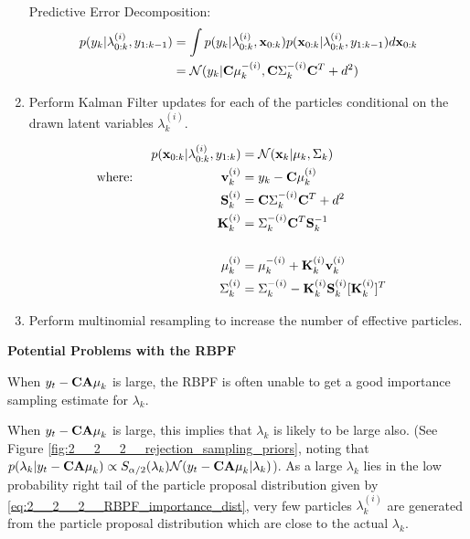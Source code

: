 \documentclass[../main.tex]{subfiles}
\begin{document}
\begin{enumerate}
	Predictive Error Decomposition:
	\begin{align}
		p(y_k | \lambda_{0:k}^{(i)}, y_{1:k-1}) &= \int p(y_k | \lambda_{0:k}^{(i)}, {\bf x}_{0:k}) p( {\bf x}_{0:k} | \lambda_{0:k}^{(i)}, y_{1:k-1}) d{\bf x}_{0:k}\notag\\
		&= \mathcal{N}(y_k | {\bf C} \mu_{k}^{-(i)}, {\bf C} \Sigma_k^{-(i)} {\bf C}^T  + d^2)
	\end{align}
	
	\item Perform Kalman Filter updates for each of the particles conditional on the drawn latent variables $\lambda_k^{(i)}$.
	
	\begin{align}
		& & p({\bf x}_{0:k} | \lambda_{0:k}^{(i)}, y_{1:k}) &= \mathcal{N}({\bf x}_k | \mu_k, \Sigma_k) &&\\
		& \text{where: } & {\bf v}_k^{(i)} &= y_k - {\bf C}\mu_k^{(i)}&& \notag\\
		&& {\bf S}_k^{(i)} &= {\bf C}\Sigma_k^{-(i)}{\bf C}^T + d^2&& \notag\\    
		&& {\bf K}_k^{(i)} &= \Sigma_k^{-(i)}{\bf C}^T {\bf S}_k^{-1}&&\notag\\ 
		\notag\\
		&& \mu_k^{(i)} &= \mu_k^{-(i)} + {\bf K}_k^{(i)} {\bf v}_k^{(i)}&& \notag\\
		&&\Sigma_k^{(i)} &= \Sigma_k^{-(i)} - {\bf K}_k^{(i)}{\bf S}_k^{(i)} [{\bf K}_k^{(i)}]^T&& \notag
	\end{align}
	
	
	\item Perform multinomial resampling to increase the number of effective particles.
	
\end{enumerate}

\textbf{Potential Problems with the RBPF}

When $y_t - {\bf CA\mu}_k$ is large, the RBPF is often unable to get a good importance sampling estimate for $\lambda_k$.

When $y_t - {\bf CA\mu}_k$ is large, this implies that $\lambda_k$ is likely to be large also. (See Figure \ref{fig:2__2__2__rejection_sampling_priors}, noting that $p(\lambda_k | y_t - {\bf CA\mu}_k) \propto S_{\alpha/2}(\lambda_k)\mathcal{N}(y_t - {\bf CA\mu}_k | \lambda_k)$). As a large $\lambda_k$ lies in the low probability right tail of the particle proposal distribution given by \autoref{eq:2__2__2__RBPF_importance_dist}, very few particles $\lambda_k^{(i)}$ are generated from the particle proposal distribution which are close to the actual $\lambda_k$. 
\end{document}
